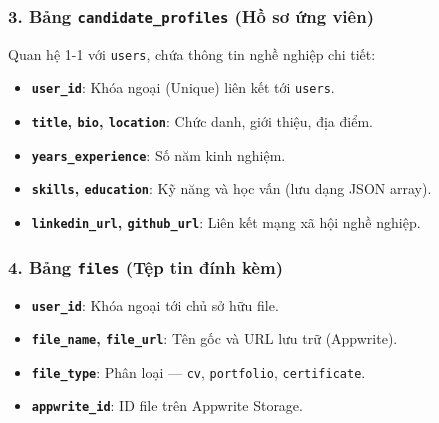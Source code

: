 \subsubsection*{3. Bảng \texttt{candidate\_profiles} (Hồ sơ ứng viên)}
Quan hệ 1-1 với \texttt{users}, chứa thông tin nghề nghiệp chi tiết:
\begin{itemize}
    \item \textbf{\texttt{user\_id}}: Khóa ngoại (Unique) liên kết tới \texttt{users}.
    \item \textbf{\texttt{title}, \texttt{bio}, \texttt{location}}: Chức danh, giới thiệu, địa điểm.
    \item \textbf{\texttt{years\_experience}}: Số năm kinh nghiệm.
    \item \textbf{\texttt{skills}, \texttt{education}}: Kỹ năng và học vấn (lưu dạng JSON array).
    \item \textbf{\texttt{linkedin\_url}, \texttt{github\_url}}: Liên kết mạng xã hội nghề nghiệp.
\end{itemize}

\subsubsection*{4. Bảng \texttt{files} (Tệp tin đính kèm)}
\begin{itemize}
    \item \textbf{\texttt{user\_id}}: Khóa ngoại tới chủ sở hữu file.
    \item \textbf{\texttt{file\_name}, \texttt{file\_url}}: Tên gốc và URL lưu trữ (Appwrite).
    \item \textbf{\texttt{file\_type}}: Phân loại --- \texttt{cv}, \texttt{portfolio}, \texttt{certificate}.
    \item \textbf{\texttt{appwrite\_id}}: ID file trên Appwrite Storage.
\end{itemize}

